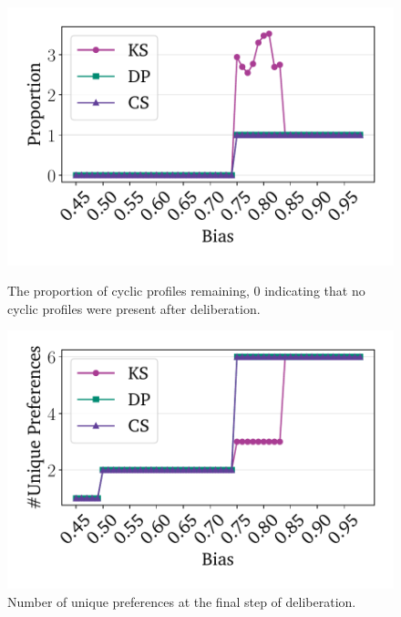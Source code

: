 \documentclass[11pt, oneside, dvipsnames]{Thesis} %
\begin{document}
\begin{figure}[htbp]
	\centering
	\begin{minipage}{0.45\textwidth}
		\centering
		\includegraphics[width=\textwidth]{Figures/cyclic_proportion_Proportion.pdf}
		\caption{The proportion of cyclic profiles remaining, 0 indicating that no cyclic profiles were present after deliberation.}
		\label{fig:rep_cyclic}
	\end{minipage}\hfill
	\begin{minipage}{0.45\textwidth}
		\centering
		\vspace{-9pt}
		\includegraphics[width=\textwidth]{Figures/unique_Unique Preferences.pdf}
		\caption{Number of unique preferences at the final step of deliberation.}
		\label{fig:rep_count}
	\end{minipage}

	\vspace{1em}


\end{figure}
\end{document}
